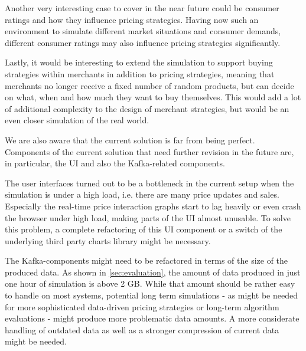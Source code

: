 Another very interesting case to cover in the near future could be consumer ratings and how they influence pricing strategies. Having now such an environment to simulate different market situations and consumer demands, different consumer ratings may also influence pricing strategies significantly. 

Lastly, it would be interesting to extend the simulation to support buying strategies within merchants in addition to pricing strategies, meaning that merchants no longer receive a fixed number of random products, but can decide on what, when and how much they want to buy themselves. This would add a lot of additional complexity to the design of merchant strategies, but would be an even closer simulation of the real world.

We are also aware that the current solution is far from being perfect. Components of the current solution that need further revision in the future are, in particular, the UI and also the Kafka-related components.

The user interfaces turned out to be a bottleneck in the current setup when the simulation is under a high load, i.e. there are many price updates and sales. Especially the real-time price interaction graphs start to lag heavily or even crash the browser under high load, making parts of the UI almost unusable. To solve this problem, a complete refactoring of this UI component or a switch of the underlying third party charts library might be necessary.

The Kafka-components might need to be refactored in terms of the size of the produced data. As shown in \cref{sec:evaluation}, the amount of data produced in just one hour of simulation is above 2 GB. While that amount should be rather easy to handle on most systems, potential long term simulations - as might be needed for more sophisticated data-driven pricing strategies or long-term algorithm evaluations - might produce more problematic data amounts. A more considerate handling of outdated data as well as a stronger compression of current data might be needed. 


